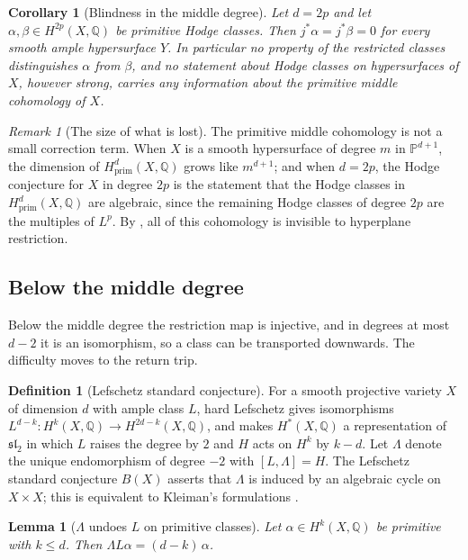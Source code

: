 \documentclass[11pt,reqno]{amsart}
\theoremstyle{plain}
\newtheorem{lemma}[theorem]{Lemma}
\newtheorem{corollary}[theorem]{Corollary}
\theoremstyle{definition}
\newtheorem{definition}[theorem]{Definition}
\theoremstyle{remark}
\newtheorem{remark}[theorem]{Remark}
\newcommand{\QQ}{\mathbb{Q}}
\newcommand{\PP}{\mathbb{P}}
\begin{document}
\begin{corollary}[Blindness in the middle degree]\label{cor:blind}
Let $d=2p$ and let $\alpha,\beta\in H^{2p}(X,\QQ)$ be primitive Hodge classes.
Then $j^{*}\alpha=j^{*}\beta=0$ for every smooth ample hypersurface $Y$. In
particular no property of the restricted classes distinguishes $\alpha$ from
$\beta$, and no statement about Hodge classes on hypersurfaces of $X$, however
strong, carries any information about the primitive middle cohomology of $X$.
\end{corollary}

\begin{remark}[The size of what is lost]\label{rem:sizeofloss}
The primitive middle cohomology is not a small correction term. When $X$ is
a smooth hypersurface of degree $m$ in $\PP^{d+1}$, the dimension of
$H^{d}_{\mathrm{prim}}(X,\QQ)$ grows like $m^{d+1}$; and when $d=2p$, the
Hodge conjecture for $X$ in degree $2p$ is the statement that the Hodge
classes in $H^{d}_{\mathrm{prim}}(X,\QQ)$ are algebraic, since the remaining
Hodge classes of degree $2p$ are the multiples of $L^{p}$. By
, all of this cohomology is invisible to hyperplane
restriction.
\end{remark}

\subsection{Below the middle degree}

Below the middle degree the restriction map is injective, and in degrees at
most $d-2$ it is an isomorphism, so a class can be transported downwards. The
difficulty moves to the return trip.

\begin{definition}[Lefschetz standard conjecture]\label{def:Bconj}
For a smooth projective variety $X$ of dimension $d$ with ample class $L$,
hard Lefschetz gives isomorphisms
$L^{d-k}\colon H^{k}(X,\QQ)\to H^{2d-k}(X,\QQ)$, and makes $H^{*}(X,\QQ)$
a representation of $\mathfrak{sl}_{2}$ in which $L$ raises the degree by
$2$ and $H$ acts on $H^{k}$ by $k-d$. Let $\Lambda$ denote the unique
endomorphism of degree $-2$ with $[L,\Lambda]=H$. The Lefschetz standard
conjecture $B(X)$ asserts that $\Lambda$ is induced by an algebraic cycle on
$X\times X$; this is equivalent to Kleiman's formulations \cite{Kle68,Kle94}.
\end{definition}

\begin{lemma}[$\Lambda$ undoes $L$ on primitive classes]\label{lem:LambdaL}
Let $\alpha\in H^{k}(X,\QQ)$ be primitive with $k\le d$. Then
$\Lambda L\alpha=(d-k)\,\alpha$.
\end{lemma}
\end{document}
